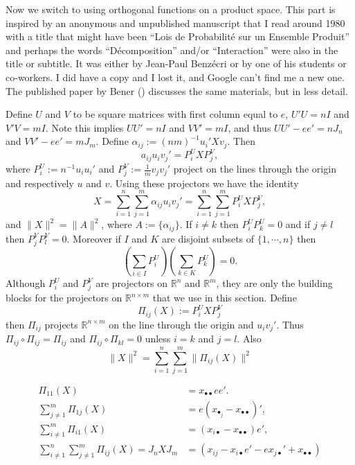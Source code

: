 \documentclass[
  12pt,
  letterpaper,
  DIV=11,
  numbers=noendperiod]{scrartcl}
\begin{document}
Now we switch to using orthogonal functions on a product space. This
part is inspired by an anonymous and unpublished manuscript that I read
around 1980 with a title that might have been ``Lois de Probabilité sur
un Ensemble Produit'' and perhaps the words ``Décomposition'' and/or
``Interaction'' were also in the title or subtitle. It was either by
Jean-Paul Benzécri or by one of his students or co-workers. I did have a
copy and I lost it, and Google can't find me a new one. The published
paper by Bener () discusses the same
materials, but in less detail.

Define \(U\) and \(V\) to be square matrices with first column equal to
\(e\), \(U'U=nI\) and \(V'V=mI\). Note this implies \(UU'=nI\) and
\(VV'=mI\), and thus \(UU'-ee'=nJ_n\) and \(VV'-ee'=mJ_m\). Define
\(\alpha_{ij}:=(nm)^{-1}u_i'Xv_j\). Then \begin{equation}
a_{ij}u_iv_j'=P_i^UXP^V_j,
\end{equation} where \(P_i^U:=n^{-1}u_iu_i'\) and
\(P_j^V:=\frac{1}{m}v_jv_j'\) project on the lines through the origin
and respectively \(u\) and \(v\). Using these projectors we have the
identity \begin{equation}
X=\sum_{i=1}^n\sum_{j=1}^m\alpha_{ij}u_iv_j'=\sum_{i=1}^n\sum_{j=1}^mP_i^UXP^V_j,
\end{equation} and \(\|X\|^2=\|A\|^2\), where \(A:=\{\alpha_{ij}\}\). If
\(i\neq k\) then \(P_i^UP_k^U=0\) and if \(j\neq l\) then
\(P_j^VP_l^V=0\). Moreover if \(I\) and \(K\) are disjoint subsets of
\(\{1,\cdots,n\}\) then \begin{equation}
\left(\sum_{i\in I}P_i^U\right)\left(\sum_{k\in K}P_k^U\right)=0.
\end{equation} Although \(P_i^U\) and \(P_j^V\) are projectors on
\(\mathbb{R}^n\) and \(\mathbb{R}^m\), they are only the building blocks
for the projectors on \(\mathbb{R}^{n\times m}\) that we use in this
section. Define \begin{equation}
\Pi_{ij}(X):=P_i^UXP_j^V
\end{equation} then \(\Pi_{ij}\) projects \(\mathbb{R}^{n\times m}\) on
the line through the origin and \(u_iv_j'\). Thus
\(\Pi_{ij}\circ\Pi_{ij}=\Pi_{ij}\) and \(\Pi_{ij}\circ\Pi_{kl}= 0\)
unless \(i=k\) and \(j=l\). Also \begin{equation}
\|X\|^2=\sum_{i=1}^n\sum_{j=1}^m\|\Pi_{ij}(X)\|^2
\end{equation}

\begin{subequations}
\begin{align}
\Pi_{11}(X)&=x_{\bullet\bullet}ee'.\\
\sum_{j\neq 1}^m\Pi_{1j}(X)&=e(x_{\bullet_j}-x_{\bullet\bullet})',\\
\sum_{i\neq 1}^m\Pi_{i1}(X)&=(x_{i\bullet}-x_{\bullet\bullet})e',\\
\sum_{i\neq 1}^n\sum_{j\neq 1}^m\Pi_{ij}(X)=J_nXJ_m&=(x_{ij}-x_{i\bullet}e'-ex_{j\bullet}'+x_{\bullet\bullet})
\end{align}
\end{subequations}
\end{document}
